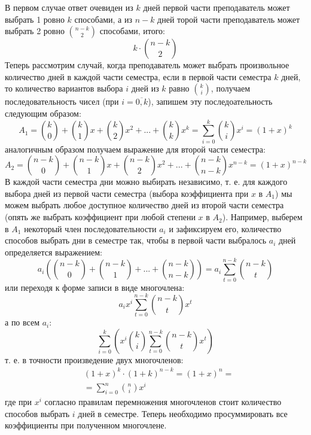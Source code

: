 \documentclass[a4paper,12pt]{article}
\begin{document}
\begin{Solution}
В первом случае ответ очевиден из $k$ дней первой части преподаватель может выбрать 1 ровно $k$ способами, а из $n-k$ дней торой части преподаватель может выбрать 2 ровно $\binom{n-k}{2}$ способами, итого:
\[
	k \cdot \binom{n-k}{2}
\]
Теперь рассмотрим случай, когда преподаватель может выбрать произвольное количество дней в каждой части семестра, если в первой части семестра $k$ дней, то количество вариантов выбора $i$ дней из $k$ равно $\binom{k}{i}$, получаем последовательность чисел (при $i = \overline{0,k}$), запишем эту последоательность следующим образом:
\[
	A_1 = \binom{k}{0} + \binom{k}{1}x + \binom{k}{2}x^2 + ... + \binom{k}{k} x^k = \sum_{i=0}^{k} \binom{k}{i}x^i = {\left(1+x\right)}^k
\]
аналогичным образом получаем выражение для второй части семестра:
\[
	A_2 = \binom{n-k}{0} + \binom{n-k}{1}x + \binom{n-k}{2}x^2 + ... + \binom{n-k}{n-k} x^{n-k} = {\left(1+x\right)}^{n-k}
\]
В каждой части семестра дни можно выбирать независимо, т. е. для каждого выбора дней из первой части семестра (выбора коэффициента при $x$ в $A_1$) мы можем выбрать любое доступное количество дней из второй части семестра (опять же выбрать коэффициент при любой степени $x$ в $A_2$). Например, выберем в $A_1$ некоторый член последовательности $a_i$ и зафиксируем его, количество способов выбрать дни в семестре так, чтобы в первой части выбралось $a_i$ дней определяется выражением:
\[
	a_i \left(\binom{n-k}{0} + \binom{n-k}{1} + ... + \binom{n-k}{n-k}\right) = a_i \sum_{t=0}^{n-k} \binom{n-k}{t}
\]
или переходя к форме записи в виде многочлена:
\[
	a_i x^i \sum_{t=0}^{n-k} \binom{n-k}{t} x^t
\]
а по всем $a_i$:
\[
	\sum_{i=0}^k \left(x^i \binom{k}{i} \sum_{t=0}^{n-k} \binom{n-k}{t} x^t\right)
\]
т. е. в точности произведение двух многочленов:
\[
	\begin{split}
		& {\left(1+x\right)}^k \cdot {\left(1+k\right)}^{n-k} = {\left(1+x\right)}^n = \\
		& = \sum_{i=0}^n \binom{n}{i} x^i
	\end{split}
\]
где при $x^i$ согласно правилам перемножения многочленов стоит количество способов выбрать $i$ дней в семестре. Теперь необходимо просуммировать все коэффициенты при полученном многочлене.
\end{Solution}
\end{document}
